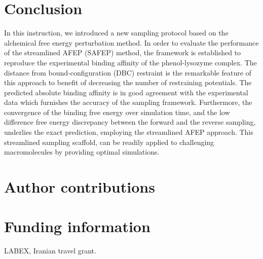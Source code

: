 \documentclass[9pt,tutorial]{livecoms}
\begin{document}
\section{Conclusion}
In this instruction, we introduced a new sampling protocol based on the alchemical free energy perturbation method. In order to evaluate the performance of the streamlined AFEP (SAFEP) method, the framework is established to reproduce the experimental binding affinity of the phenol-lysozyme complex. The distance from bound-configuration (DBC) restraint is the remarkable feature of this approach to benefit of decreasing the number of restraining potentials. The predicted absolute binding affinity is in good agreement with the experimental data which furnishes the accuracy of the sampling framework. Furthermore, the convergence of the binding free energy over simulation time, and the low difference free energy discrepancy between the forward and the reverse sampling, underlies the exact prediction, employing the streamlined AFEP approach. This streamlined sampling scaffold, can be readily applied to challenging macromolecules by providing optimal simulations.

\section{Author contributions}

\section{Funding information}

LABEX, Iranian travel grant.

% 

\end{document}
